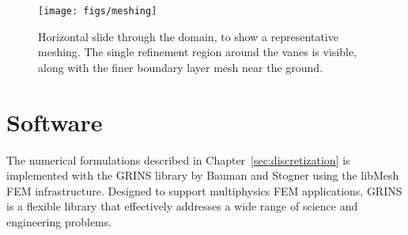   \begin{figure}[!htb]
    \begin{center}
     \texttt{[image: figs/meshing]}
     \caption{Horizontal slide through the domain, to show a
     representative meshing. The single refinement region around the
     vanes is visible, along with the finer boundary layer mesh near the
     ground.}
     \label{fig:meshing}
    \end{center}
  \end{figure}


%



\section{Software}

The numerical formulations described in Chapter~\ref{sec:discretization}
is implemented with the GRINS library\cite{GRINSpaper} by Bauman
and Stogner using the libMesh\cite{libMeshPaper} FEM
infrastructure. Designed to support multiphysics FEM applications, 
GRINS is a flexible library that effectively addresses a wide range of 
science and engineering problems.   
 

